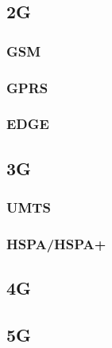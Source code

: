 \subsection{2G}


\subsubsection{GSM}


\subsubsection{GPRS}


\subsubsection{EDGE}


\subsection{3G}


\subsubsection{UMTS}


\subsubsection{HSPA/HSPA+}


\subsection{4G}


\subsection{5G}